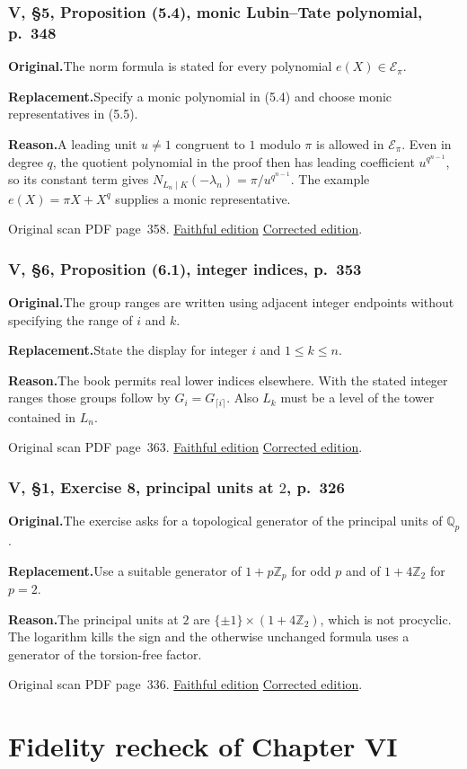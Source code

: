 \documentclass[11pt,a4paper]{article}
\newcommand{\original}{\par\smallskip\noindent\textbf{Original.}\enspace}
\newcommand{\replacement}{\par\smallskip\noindent\textbf{Replacement.}\enspace}
\newcommand{\reason}{\par\smallskip\noindent\textbf{Reason.}\enspace}
\newcommand{\editionlink}[3]{\href{#1\#errata.#2}{#3}}
\newcommand{\location}[2]{%
  \par\smallskip\noindent Original scan PDF page~#2.\enspace
  \editionlink{Neukirch_Faithful.pdf}{#1}{Faithful edition}
  \quad\editionlink{Neukirch_Corrected.pdf}{#1}{Corrected edition}.}
\begin{document}
\section{V, \S5, Proposition (5.4), monic Lubin--Tate polynomial, p.~348}\label{errata:item:196}

\original The norm formula is stated for every polynomial $e(X)\in\mathcal E_\pi$.
\replacement Specify a monic polynomial in (5.4) and choose monic representatives in (5.5).
\reason A leading unit $u\ne1$ congruent to $1$ modulo $\pi$ is allowed in $\mathcal E_\pi$. Even in degree $q$, the quotient polynomial in the proof then has leading coefficient $u^{q^{n-1}}$, so its constant term gives $N_{L_n\mid K}(-\lambda_n)=\pi/u^{q^{n-1}}$. The example $e(X)=\pi X+X^q$ supplies a monic representative.
\location{196}{358}

\setcounter{section}{196}
\section{V, \S6, Proposition (6.1), integer indices, p.~353}\label{errata:item:197}

\original The group ranges are written using adjacent integer endpoints without specifying the range of $i$ and $k$.
\replacement State the display for integer $i$ and $1\le k\le n$.
\reason The book permits real lower indices elsewhere. With the stated integer ranges those groups follow by $G_i=G_{\lceil i\rceil}$. Also $L_k$ must be a level of the tower contained in $L_n$.
\location{197}{363}

\setcounter{section}{201}
\section{V, \S1, Exercise 8, principal units at $2$, p.~326}\label{errata:item:202}

\original The exercise asks for a topological generator of the principal units of $\mathbb Q_p$.
\replacement Use a suitable generator of $1+p\mathbb Z_p$ for odd $p$ and of $1+4\mathbb Z_2$ for $p=2$.
\reason The principal units at $2$ are $\{\pm1\}\times(1+4\mathbb Z_2)$, which is not procyclic. The logarithm kills the sign and the otherwise unchanged formula uses a generator of the torsion-free factor.
\location{202}{336}

\part{Fidelity recheck of Chapter VI}
\setcounter{section}{197}
\end{document}
